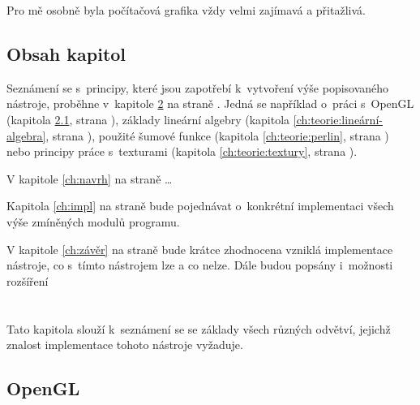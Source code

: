 Pro mě osobně byla počítačová grafika vždy velmi zajímavá a přitažlivá.


\pagebreak
\section{Obsah kapitol}
Seznámení se s~principy, které jsou zapotřebí k~vytvoření výše popisovaného nástroje, proběhne v~kapitole \ref{ch:teorie} na straně \pageref{ch:teorie}.
Jedná se například o~práci
s~OpenGL (kapitola \ref{ch:teorie:opengl}, strana \pageref{ch:teorie:opengl}),
základy lineární algebry (kapitola \ref{ch:teorie:lineární-algebra}, strana \pageref{ch:teorie:lineární-algebra}),
použité šumové funkce (kapitola \ref{ch:teorie:perlin}, strana \pageref{ch:teorie:perlin})
nebo principy práce s~texturami (kapitola \ref{ch:teorie:textury}, strana \pageref{ch:teorie:textury}).

V kapitole \ref{ch:navrh} na straně \pageref{ch:navrh} \dots
{}

Kapitola \ref{ch:impl} na straně \pageref{ch:impl} bude pojednávat o~konkrétní implementaci všech výše zmíněných modulů programu.

V kapitole \ref{ch:závěr} na straně \pageref{ch:závěr} bude krátce zhodnocena vzniklá implementace nástroje, co s~tímto nástrojem lze a co nelze.
Dále budou popsány i~možnosti rozšíření


%
\chapter{}\label{ch:teorie}
Tato kapitola slouží k~seznámení se se základy všech různých odvětví, jejichž znalost implementace tohoto nástroje vyžaduje.


\section{OpenGL}\label{ch:teorie:opengl}

